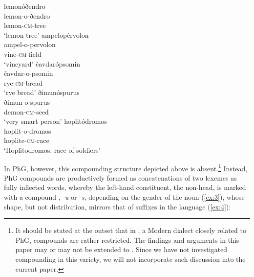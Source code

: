 \documentclass[output=paper]{LSP/langsci}
\begin{document}
\ea\label{ex:1} 
	\ea\label{ex:1a}\settowidth{}
		\glll	lemonóðendro\\
			    lemon-o-ðendro\\
			    lemon-\textsc{cm}-tree\\ 
		\glt	`lemon tree'
	\ex\label{ex:1b} \settowidth{}
		\glll	ampelopérvolon\\
				ampel-o-pervolon\\
				vine-\textsc{cm}-field\\ 
		\glt	`vineyard'
	\ex\label{ex:1c} \settowidth{}
		\glll	čavdarópsomin\\
				čavdar-o-psomin\\
				rye-\textsc{cm}-bread\\
		\glt `rye bread'
	\ex\label{ex:1d} \settowidth{}
		\glll	ðimunóspurus\\
				ðimun-o-spurus\\
				demon-\textsc{cm}-seed\\ 
		\glt `very smart person'
	\z
\z
	\ea\label{ex:2} \settowidth{}
		\glll hoplitódromos\\
				hoplit-o-dromos\\
				hoplite-\textsc{cm}-race\\ 
		\glt	`Hoplitodromos, race of soldiers'
\z
 
 In PhG, however, this  compounding structure depicted above is absent.\footnote{It should be stated at the outset that in  , a Modern  dialect closely related to PhG,  compounds are rather restricted. The findings and arguments in this paper may or may not be extended to  . Since we have not investigated compounding in this variety, we will not incorporate such discussion into the current paper.} Instead, PhG compounds are productively formed as concatenations of two lexemes as fully inflected words, whereby the left-hand constituent, the non-head, is marked with a compound , -\textit{u} or -\textit{s}, depending on the gender of the noun (\ref{ex:3}), whose shape, but not distribution, mirrors that of  suffixes in the language (\ref{ex:4}):
 
\end{document}
